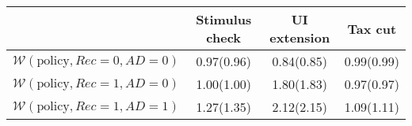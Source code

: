 \begin{tabular}{@{}lccc@{}} 
\toprule 
                          & Stimulus check      & UI extension    & Tax cut    \\  \midrule 
$\mathcal{W}(\text{policy}, Rec=0, AD=0)$ & 0.97(0.96)  & 0.84(0.85)  & 0.99(0.99)     \\ 
$\mathcal{W}(\text{policy}, Rec=1, AD=0)$ & 1.00(1.00)  & 1.80(1.83)  & 0.97(0.97)     \\ 
$\mathcal{W}(\text{policy}, Rec=1, AD=1)$ & 1.27(1.35)  & 2.12(2.15)  & 1.09(1.11)     \\ \bottomrule 
\end{tabular}  
